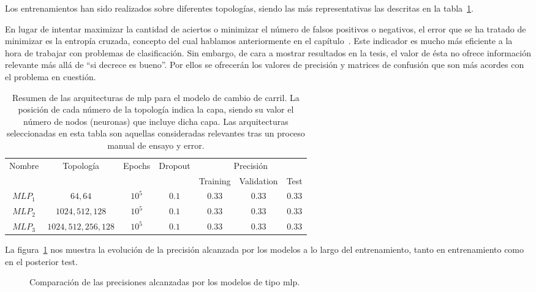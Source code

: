 Los entrenamientos han sido realizados sobre diferentes topologías, siendo las más representativas las descritas en la tabla~\ref{tbl:lc-mlp-architectures}.

En lugar de intentar maximizar la cantidad de aciertos o minimizar el número de falsos positivos o negativos, el error que se ha tratado de minimizar es la entropía cruzada, concepto del cual hablamos anteriormente en el capítulo~. Este indicador es mucho más eficiente a la hora de trabajar con problemas de clasificación. Sin embargo, de cara a mostrar resultados en la tesis, el valor de ésta no ofrece información relevante más allá de \enquote{si decrece es bueno}. Por ellos se ofrecerán los valores de precisión y matrices de confusión que son más acordes con el problema en cuestión.

\begin{table}[t]
	\caption[Resumen de las arquitecturas \ac{mlp} para el modelo de cambio de carril]{Resumen de las arquitecturas de \ac{mlp} para el modelo de cambio de carril. La posición de cada número de la topología indica la capa, siendo su valor el número de nodos (neuronas) que incluye dicha capa. Las arquitecturas seleccionadas en esta tabla son aquellas consideradas relevantes tras un proceso manual de ensayo y error.}
	\label{tbl:lc-mlp-architectures}
	\begin{tabular}{ccccccc}
		\hline
		\multirow{2}{*}{Nombre} & \multirow{2}{*}{Topología} & \multirow{2}{*}{Epochs} & \multirow{2}{*}{Dropout} & \multicolumn{3}{c}{Precisión}  \\
		& & & & Training & Validation & Test \\ \hline
		$MLP_1$ & $64, 64$              & $10^5$ & $0.1$ & $0.33$ & $0.33$ & $0.33$ \\
		$MLP_2$ & $1024, 512, 128$      & $10^5$ & $0.1$ & $0.33$ & $0.33$ & $0.33$ \\
		$MLP_3$ & $1024, 512, 256, 128$ & $10^5$ & $0.1$ & $0.33$ & $0.33$ & $0.33$ \\ \hline
	\end{tabular}
\end{table}

La figura~\ref{fig:lc-mlp-accuracy-comparison} nos muestra la evolución de la precisión alcanzada por los modelos a lo largo del entrenamiento, tanto en entrenamiento como en el posterior test.

\begin{figure}
	\centering
	\qquad
	\caption[Comparación de las precisiones alcanzadas por los modelos de tipo \ac{mlp}]{Comparación de las precisiones alcanzadas por los modelos de tipo \ac{mlp}.}
	\label{fig:lc-mlp-accuracy-comparison}
\end{figure}

